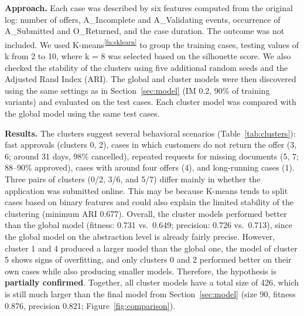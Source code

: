 \documentclass[
  english,        %
  font=times,     %
  twocolumn,      %
]{tumarticle}
\begin{document}
\textbf{Approach.} Each case was described by six features computed from the original log: number of offers, A\_Incomplete and A\_Validating events, occurrence of A\_Submitted and O\_Returned, and the case duration. The outcome was not included. We used K-means\textsuperscript{\ref{fn:sklearn}} to group the training cases, testing values of k from 2 to 10, where k = 8 was selected based on the silhouette score. We also checked the stability of the clusters using five additional random seeds and the Adjusted Rand Index (ARI). The global and cluster models were then discovered using the same settings as in Section~\ref{sec:model} (IM 0.2, 90\% of training variants) and evaluated on the test cases. Each cluster model was compared with the global model using the same test cases.

\begin{table}[!htb]
    \caption{Cluster profiles (training cases): share of cases, mean number of offers (Off.), A\_Incomplete (Inc.) and A\_Validating (Val.) events, share with A\_Submitted (Sub.) and O\_Returned (Ret.), median duration and outcome shares. The outcome was not used for clustering.}
    \label{tab:clusters}
    \centering
    \small
    \setlength{\tabcolsep}{1.4pt}
    
\end{table}

\textbf{Results.} The clusters suggest several behavioral scenarios (Table~\ref{tab:clusters}): fast approvals (clusters 0, 2), cases in which customers do not return the offer (3, 6; around 31 days, 98\% cancelled), repeated requests for missing documents (5, 7; 88--90\% approved), cases with around four offers (4), and long-running cases (1). Three pairs of clusters (0/2, 3/6, and 5/7) differ mainly in whether the application was submitted online. This may be because K-means tends to split cases based on binary features and could also explain the limited stability of the clustering (minimum ARI 0.677). Overall, the cluster models performed better than the global model (fitness: 0.731 vs.\ 0.649; precision: 0.726 vs.\ 0.713), since the global model on the abstraction level is already fairly precise. However, cluster 1 and 4 produced a larger model than the global one, the model of cluster 5 shows signs of overfitting, and only clusters 0 and 2 performed better on their own cases while also producing smaller models. Therefore, the hypothesis is \textbf{partially confirmed}. Together, all cluster models have a total size of 426, which is still much larger than the final model from Section~\ref{sec:model} (size 90, fitness 0.876, precision 0.821; Figure~\ref{fig:comparison}).
\end{document}
